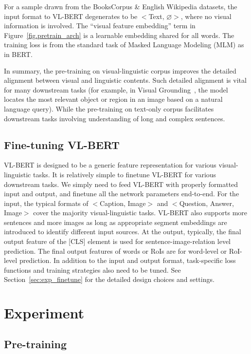 For a sample drawn from the BooksCorpus \& English Wikipedia datasets, the input format to VL-BERT degenerates to be $<$Text, $\varnothing>$, where no visual information is involved. The ``visual feature embedding'' term in Figure~\ref{fig.pretrain_arch} is a learnable embedding shared for all words. The training loss is from the standard task of Masked Language Modeling (MLM) as in BERT.

In summary, the pre-training on visual-linguistic corpus improves the detailed alignment between visual and linguistic contents. Such detailed alignment is vital for many downstream tasks (for example, in Visual Grounding~\citep{kazemzadeh2014referitgame}, the model locates the most relevant object or region in an image based on a natural language query). While the pre-training on text-only corpus facilitates downstream tasks involving understanding of long and complex sentences.

\subsection{Fine-tuning VL-BERT}

VL-BERT is designed to be a generic feature representation for various visual-linguistic tasks. It is relatively simple to finetune VL-BERT for various downstream tasks. We simply need to feed VL-BERT with properly formatted input and output, and finetune all the network parameters end-to-end. For the input, the typical formats of $<$Caption, Image$>$ and $<$Question, Answer, Image$>$ cover the majority visual-linguistic tasks. VL-BERT also supports more sentences and more images as long as appropriate segment embeddings are introduced to identify different input sources. At the output, typically, the final output feature of the [CLS] element is used for sentence-image-relation level prediction. The final output features of words or RoIs are for word-level or RoI-level prediction. In addition to the input and output format, task-specific loss functions and training strategies also need to be tuned. See Section~\ref{sec:exp_finetune} for the detailed design choices and settings.

\section{Experiment}

\subsection{Pre-training}

